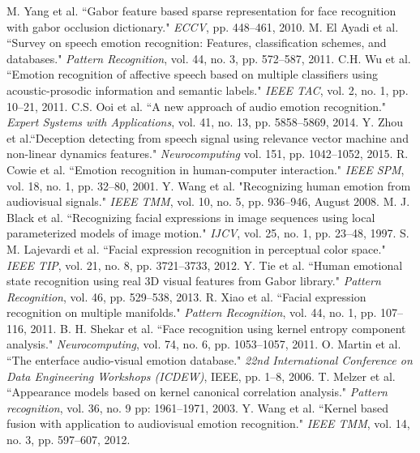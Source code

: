\documentclass[journal]{IEEEtran}
\begin{document}
\begin{thebibliography}{1}
M. Yang et al. ``Gabor feature based sparse representation for face recognition with gabor occlusion dictionary." \emph{ECCV}, pp. 448--461, 2010.
M. El Ayadi et al. ``Survey on speech emotion recognition: Features, classification schemes, and databases." \emph{Pattern Recognition}, vol. 44, no. 3, pp. 572--587, 2011.
C.H. Wu et al. ``Emotion recognition of affective speech based on multiple classifiers using acoustic-prosodic information and semantic labels." \emph{IEEE TAC}, vol. 2, no. 1, pp. 10--21, 2011.
C.S. Ooi et al. ``A new approach of audio emotion recognition." \emph{Expert Systems with Applications}, vol. 41, no. 13, pp. 5858--5869, 2014.
Y. Zhou et al.``Deception detecting from speech signal using relevance vector machine and non-linear dynamics features." \emph{Neurocomputing} vol. 151, pp. 1042--1052, 2015.
R. Cowie et al. ``Emotion recognition in human-computer interaction." \emph{IEEE SPM}, vol. 18, no. 1, pp. 32--80, 2001.
Y. Wang et al. "Recognizing human emotion from audiovisual signals." \emph{IEEE TMM}, vol. 10, no. 5, pp. 936--946, August 2008.
M. J. Black et al. ``Recognizing facial expressions in image sequences using local parameterized models of image motion." \emph{IJCV}, vol. 25, no. 1, pp. 23--48, 1997.
S. M. Lajevardi et al. ``Facial expression recognition in perceptual color space." \emph{IEEE TIP}, vol. 21, no. 8, pp. 3721--3733, 2012.
Y. Tie et al. ``Human emotional state recognition using real 3D visual features from Gabor library." \emph{Pattern Recognition}, vol. 46, pp. 529--538, 2013.
R. Xiao et al. ``Facial expression recognition on multiple manifolds." \emph{Pattern Recognition}, vol. 44, no. 1, pp. 107--116, 2011.
B. H. Shekar et al. ``Face recognition using kernel entropy component analysis." \emph{Neurocomputing}, vol. 74, no. 6, pp. 1053--1057, 2011.
O. Martin et al. ``The enterface audio-visual emotion database." \emph{22nd International Conference on Data Engineering Workshops (ICDEW)}, IEEE, pp. 1--8, 2006.
T. Melzer et al. ``Appearance models based on kernel canonical correlation analysis." \emph{Pattern recognition}, vol. 36, no. 9 pp: 1961--1971, 2003.
Y. Wang et al. ``Kernel based fusion with application to audiovisual emotion recognition." \emph{IEEE TMM}, vol. 14, no. 3, pp. 597--607, 2012.

\end{thebibliography}
\end{document}
